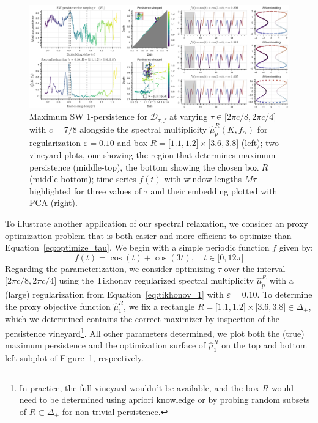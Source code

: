 \documentclass[pdflatex,sn-mathphys-num]{sn-jnl}
\begin{document}
\begin{figure}
\centering
\includegraphics[width=1\linewidth,height=\textheight,keepaspectratio]{../images/sw1pers_mu.png}
\caption{Maximum SW 1-persistence for \(\mathcal{D}_{\tau,f}\) at varying \(\tau \in \lbrack 2\pi c/8,2\pi c/4\rbrack\) with \(c = 7/8\) alongside the spectral multiplicity \({\hat{\mu}}_{p}^{R}\left( K,f_{\alpha} \right)\) for regularization \(\varepsilon = 0.10\) and box \(R = \lbrack 1.1,1.2\rbrack \times \lbrack 3.6,3.8\rbrack\) (left); two vineyard plots, one showing the region that determines maximum persistence (middle-top), the bottom showing the chosen box \(R\) (middle-bottom); time series \(f(t)\) with window-lengths \(M\tau\) highlighted for three values of \(\tau\) and their embedding plotted with PCA (right).}\label{fig:sw1pers_spirit}
\end{figure}

To illustrate another application of our spectral relaxation, we consider an proxy optimization problem that is both easier and more efficient to optimize than Equation~\ref{eq:optimize_tau}. We begin with a simple periodic function \(f\) given by:
\[
f(t) = \cos(t) + \cos(3t),\quad t \in \lbrack 0,12\pi\rbrack
\]
Regarding the parameterization, we consider optimizing \(\tau\) over the interval \(\lbrack 2\pi c/8,2\pi c/4\rbrack\) using the Tikhonov regularized spectral multiplicity \({\hat{\mu}}_{p}^{R}\) with a (large) regularization from Equation~\ref{eq:tikhonov_1} with \(\varepsilon = 0.10\). To determine the proxy objective function \({\hat{\mu}}_{1}^{R}\), we fix a rectangle \(R = \lbrack 1.1,1.2\rbrack \times \lbrack 3.6,3.8\rbrack \in \Delta_{+}\), which we determined contains the correct maximizer by inspection of the persistence vineyard\footnote{In practice, the full vineyard wouldn't be available, and the box \(R\) would need to be determined using apriori knowledge or by probing random subsets of \(R \subset \Delta_{+}\) for non-trivial persistence.}. All other parameters determined, we plot both the (true) maximum persistence and the optimization surface of \({\hat{\mu}}_{1}^{R}\) on the top and bottom left subplot of Figure~\ref{fig:sw1pers_spirit}, respectively.
\end{document}
